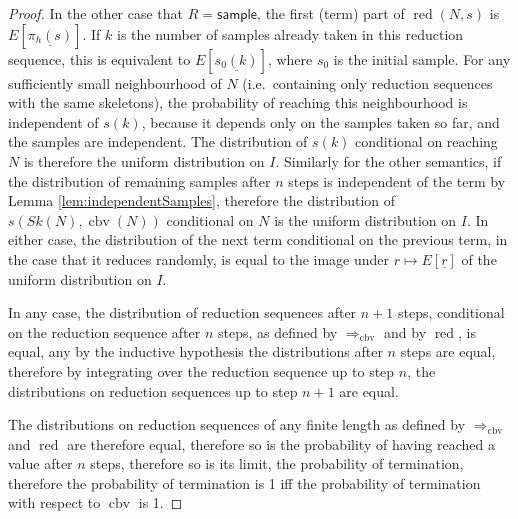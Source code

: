 \documentclass{article}
\newcommand{\tsample}{\mathsf{sample}}
\DeclareMathOperator{\red}{red}
\DeclareMathOperator{\cbv}{cbv}
\theoremstyle{definition}
\theoremstyle{lemma}
\theoremstyle{remark}
\begin{document}
\begin{proof}
In the other case that $R = \tsample$, the first (term) part of $\red(N,s)$ is $E[\underline{\pi_h(s)}]$. If $k$ is the number of samples already taken in this reduction sequence, this is equivalent to $E[\underline{s_0(k)}]$, where $s_0$ is the initial sample. For any sufficiently small neighbourhood of $N$ (i.e.~containing only reduction sequences with the same skeletons), the probability of reaching this neighbourhood is independent of $s(k)$, because it depends only on the samples taken so far, and the samples are independent. The distribution of $s(k)$ conditional on reaching $N$ is therefore the uniform distribution on $I$. Similarly for the other semantics, if the distribution of remaining samples after $n$ steps is independent of the term by Lemma \ref{lem:independentSamples}, therefore the distribution of $s(Sk(N),\cbv(N))$ conditional on $N$ is the uniform distribution on $I$. In either case, the distribution of the next term conditional on the previous term, in the case that it reduces randomly, is equal to the image under $r \mapsto E[\underline r]$ of the uniform distribution on $I$.

In any case, the distribution of reduction sequences after $n+1$ steps, conditional on the reduction sequence after $n$ steps, as defined by $\Rightarrow_{\cbv}$ and by $\red$, is equal, any by the inductive hypothesis the distributions after $n$ steps are equal, therefore by integrating over the reduction sequence up to step $n$, the distributions on reduction sequences up to step $n+1$ are equal.

The distributions on reduction sequences of any finite length as defined by $\Rightarrow_{\cbv}$ and $\red$ are therefore equal, therefore so is the probability of having reached a value after $n$ steps, therefore so is its limit, the probability of termination, therefore the probability of termination is 1 iff the probability of termination with respect to $\cbv$ is 1.
\end{proof}
\end{document}
